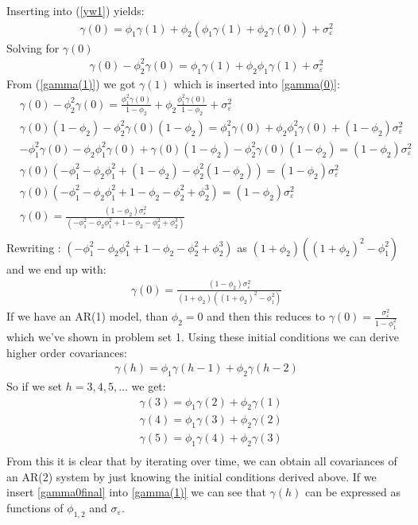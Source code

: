 \documentclass{article}
\begin{document}
Inserting into (\ref{yw1}) yields: 
\begin{align*}
\gamma(0)=\phi_1\gamma(1)+\phi_2(\phi_1\gamma(1)+\phi_2\gamma(0))+\sigma^2_\varepsilon
\end{align*}
Solving for $\gamma(0)$
\begin{align}
\gamma(0)-\phi^2_2\gamma(0)=\phi_1\gamma(1)+\phi_2\phi_1\gamma(1)+\sigma^2_\varepsilon \label{gamma(0)}
\end{align}
From (\ref{gamma(1)}) we got $\gamma(1)$ which is inserted into \ref{gamma(0)}:
\begin{align*}
& \gamma(0)-\phi^2_2\gamma(0)=\frac{\phi_1^2\gamma(0)}{1-\phi_2}+\phi_2\frac{\phi_1^2\gamma(0)}{1-\phi_2}+\sigma^2_\varepsilon\\
& \gamma(0)(1-\phi_2)-\phi^2_2\gamma(0)(1-\phi_2)=\phi^2_1\gamma(0)+\phi_2\phi^2_1\gamma(0)+(1-\phi_2)\sigma^2_\varepsilon\\
& -\phi^2_1\gamma(0)-\phi_2\phi^2_1\gamma(0)+\gamma(0)(1-\phi_2)-\phi^2_2\gamma(0)(1-\phi_2)=(1-\phi_2)\sigma^2_\varepsilon\\
& \gamma(0)(-\phi^2_1-\phi_2\phi^2_1+(1-\phi_2)-\phi^2_2(1-\phi_2))=(1-\phi_2)\sigma^2_\varepsilon\\
& \gamma(0)(-\phi^2_1-\phi_2\phi^2_1+1-\phi_2-\phi^2_2+\phi_2^3)=(1-\phi_2)\sigma^2_\varepsilon\\
& \gamma(0)=\frac{(1-\phi_2)\sigma^2_\varepsilon}{(-\phi^2_1-\phi_2\phi^2_1+1-\phi_2-\phi^2_2+\phi_2^3)}\\
\end{align*}
Rewriting : $(-\phi^2_1-\phi_2\phi^2_1+1-\phi_2-\phi^2_2+\phi_2^3)$ as $(1+\phi_2)((1+\phi_2)^2-\phi^2_1)$ and we end up with: 
\begin{align}\label{gamma0final}
\gamma(0)=\frac{(1-\phi_2)\sigma^2_\varepsilon}{(1+\phi_2)((1+\phi_2)^2-\phi^2_1)}
\end{align}
If we have an AR(1) model, than $\phi_2=0$ and then this reduces to $\gamma(0)=\frac{\sigma^2_\varepsilon}{1-\phi^2_1}$ which we've shown in problem set 1. 
Using these initial conditions we can derive higher order covariances: 
\begin{align*}
\gamma(h)=\phi_1\gamma(h-1)+\phi_2\gamma(h-2)
\end{align*} 
So if we set $h=3,4,5,\dots$ we get: 
\begin{align*}
& \gamma(3)=\phi_1\gamma(2)+\phi_2\gamma(1)\\
& \gamma(4)=\phi_1\gamma(3)+\phi_2\gamma(2)\\
& \gamma(5)=\phi_1\gamma(4)+\phi_2\gamma(3)\\
\end{align*}
From this it is clear that by iterating over time, we can obtain all covariances of an AR(2) system by just knowing the initial conditions derived above. If we insert \ref{gamma0final} into \ref{gamma(1)} we can see that $\gamma(h)$ can be expressed as functions of $\phi_{1,2}$ and $\sigma_\varepsilon$. 
\end{document}
